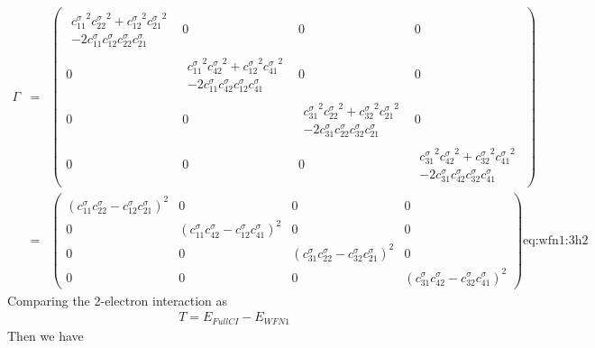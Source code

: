 \documentclass[pra,nofootinbib]{revtex4-1}
\newcommand{\dlabel}[1]{\text{#1}\label{#1}}
\begin{document}
\begin{eqnarray}
  \Gamma &=&
  \begin{pmatrix}
  \begin{matrix}
   \left.c_{11}^\sigma\right.^2\left.c_{22}^\sigma\right.^2 
  +\left.c_{12}^\sigma\right.^2\left.c_{21}^\sigma\right.^2 \\
  -2c_{11}^\sigma c_{12}^\sigma c_{22}^\sigma c_{21}^\sigma
  \end{matrix}
    & 0 & 0 & 0 \\
  0 &
  \begin{matrix}
   \left.c_{11}^\sigma\right.^2\left.c_{42}^\sigma\right.^2 
  +\left.c_{12}^\sigma\right.^2\left.c_{41}^\sigma\right.^2 \\
  -2c_{11}^\sigma c_{42}^\sigma c_{12}^\sigma c_{41}^\sigma
  \end{matrix}
    & 0 & 0 \\
  0 & 0 &
  \begin{matrix}
   \left.c_{31}^\sigma\right.^2\left.c_{22}^\sigma\right.^2 
  +\left.c_{32}^\sigma\right.^2\left.c_{21}^\sigma\right.^2 \\
  -2c_{31}^\sigma c_{22}^\sigma c_{32}^\sigma c_{21}^\sigma
  \end{matrix}
    & 0 \\
  0 & 0 & 0 & 
  \begin{matrix}
   \left.c_{31}^\sigma\right.^2\left.c_{42}^\sigma\right.^2 
  +\left.c_{32}^\sigma\right.^2\left.c_{41}^\sigma\right.^2 \\
  -2c_{31}^\sigma c_{42}^\sigma c_{32}^\sigma c_{41}^\sigma
  \end{matrix}
  \end{pmatrix} \\
  &=&
  \begin{pmatrix}
  ( c_{11}^\sigma c_{22}^\sigma - c_{12}^\sigma c_{21}^\sigma)^2
    & 0 & 0 & 0 \\
  0 &
  ( c_{11}^\sigma c_{42}^\sigma - c_{12}^\sigma c_{41}^\sigma)^2
    & 0 & 0 \\
  0 & 0 &
  ( c_{31}^\sigma c_{22}^\sigma - c_{32}^\sigma c_{21}^\sigma)^2
    & 0 \\
  0 & 0 & 0 & 
  ( c_{31}^\sigma c_{42}^\sigma - c_{32}^\sigma c_{41}^\sigma)^2
  \end{pmatrix} \dlabel{eq:wfn1:3h2}
\end{eqnarray}
Comparing the 2-electron interaction as
\begin{eqnarray}
  T = E_{FullCI} - E_{WFN1}
\end{eqnarray}
Then we have
\end{document}
